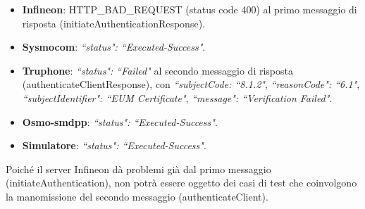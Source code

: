 \documentclass[10pt, oneside]{book}
\begin{document}
\begin{itemize}
\item \textbf{Infineon}: HTTP\_BAD\_REQUEST (status code 400) al primo messaggio di risposta (initiateAuthenticationResponse).
\item \textbf{Sysmocom}: \textit{``status": ``Executed-Success"}.
\item \textbf{Truphone}: \textit{``status": ``Failed"} al secondo messaggio di risposta (authenticateClientResponse), con \textit{``subjectCode: ``8.1.2"}, \textit{``reasonCode": ``6.1"}, \textit{``subjectIdentifier": ``EUM Certificate"}, \textit{``message": ``Verification Failed"}.
\item \textbf{Osmo-smdpp}: \textit{``status": ``Executed-Success"}.
\item \textbf{Simulatore}: \textit{``status": ``Executed-Success"}.
\end{itemize}

\noindent Poiché il server Infineon dà problemi già dal primo messaggio (initiateAuthentication), non potrà essere oggetto dei casi di test che coinvolgono la manomissione del secondo messaggio (authenticateClient).
\end{document}
